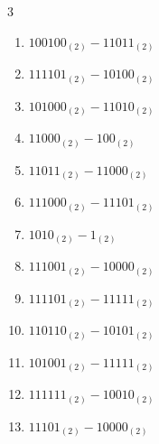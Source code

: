 \begin{multicols}{3}
\begin{enumerate}

  \item $100100_{(2)} - 11011_{(2)}$


  \item $111101_{(2)} - 10100_{(2)}$


  \item $101000_{(2)} - 11010_{(2)}$


\columnbreak %

\resetques

  \item $11000_{(2)} - 100_{(2)}$


  \item $11011_{(2)} - 11000_{(2)}$


  \item $111000_{(2)} - 11101_{(2)}$


  \item $1010_{(2)} - 1_{(2)}$


  \item $111001_{(2)} - 10000_{(2)}$


  \item $111101_{(2)} - 11111_{(2)}$


  \item $110110_{(2)} - 10101_{(2)}$


  \item $101001_{(2)} - 11111_{(2)}$


  \item $111111_{(2)} - 10010_{(2)}$


  \item $11101_{(2)} - 10000_{(2)}$



\end{enumerate}
\end{multicols}
